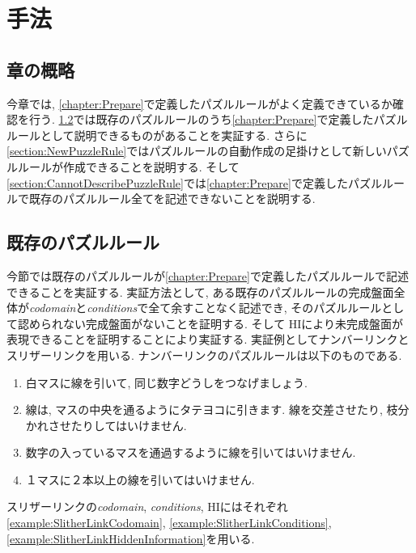 \chapter{手法}\label{chapter:3}
\section{章の概略}
今章では, \cref{chapter:Prepare}で定義したパズルルールがよく定義できているか確認を行う. \cref{section:ExistsPuzzleRule}では既存のパズルルールのうち\cref{chapter:Prepare}で定義したパズルルールとして説明できるものがあることを実証する.  さらに\cref{section:NewPuzzleRule}ではパズルルールの自動作成の足掛けとして新しいパズルルールが作成できることを説明する.
そして\cref{section:CannotDescribePuzzleRule}では\cref{chapter:Prepare}で定義したパズルルールで既存のパズルルール全てを記述できないことを説明する.

\section{既存のパズルルール}\label{section:ExistsPuzzleRule}
今節では既存のパズルルールが\cref{chapter:Prepare}で定義したパズルルールで記述できることを実証する. 実証方法として, ある既存のパズルルールの完成盤面全体が\textit{codomain}と\textit{conditions}で全て余すことなく記述でき, そのパズルルールとして認められない完成盤面がないことを証明する. そして HIにより未完成盤面が表現できることを証明することにより実証する.
実証例としてナンバーリンクとスリザーリンクを用いる. ナンバーリンクのパズルルールは以下のものである\cite{web:NumberLink}.

\begin{enumerate}
  \item 白マスに線を引いて, 同じ数字どうしをつなげましょう.
  \item 線は, マスの中央を通るようにタテヨコに引きます. 線を交差させたり, 枝分かれさせたりしてはいけません.
  \item 数字の入っているマスを通過するように線を引いてはいけません.
  \item １マスに２本以上の線を引いてはいけません.
\end{enumerate}

\begin{example}[スリザーリンクの数学的記述]
  スリザーリンクの\textit{codomain}, \textit{conditions},  HIにはそれぞれ\cref{example:SlitherLinkCodomain}, \cref{example:SlitherLinkConditions}, \cref{example:SlitherLinkHiddenInformation}を用いる.
\end{example}

